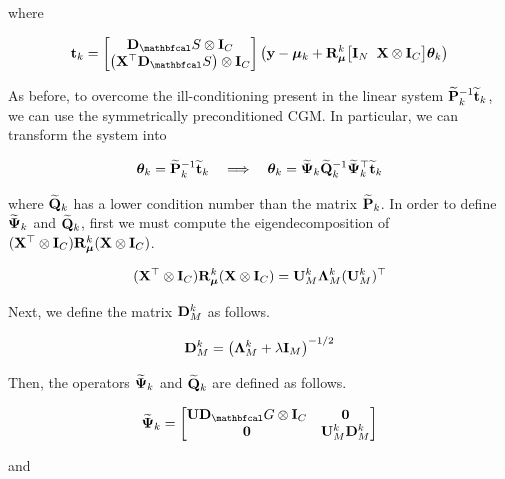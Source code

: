 \endgroup

where 

\begin{equation}
    \tee_k = \begin{bmatrix}
        \D_\St \otimes \I_C \\ \left(\X^\top \D_\St\right) \otimes \I_C
    \end{bmatrix} \left( \y - \muu_k + \RR_{\muu}^k  \big[\I_N \;\; \X \otimes \I_C\big] \thetaa_k \right)
\end{equation}

As before, to overcome the ill-conditioning present in the linear system $\widetilde{\mathbf{P}}_k^{-1} \widetilde{\mathbf{t}}_k $, we can use the symmetrically preconditioned CGM. In particular, we can transform the system into 

\begin{equation*}
    \boldsymbol{\theta}_k = \widetilde{\mathbf{P}}^{-1}_k \widetilde{\mathbf{t}}_k \quad \Longrightarrow \quad \boldsymbol{\theta}_k = \widetilde{\mathbf{\Psi}}_k \widetilde{\mathbf{Q}}_k^{-1} \widetilde{\mathbf{\Psi}}_k^\top \widetilde{\mathbf{t}}_k
\end{equation*}

where $\widetilde{\mathbf{Q}}_k$ has a lower condition number than the matrix $\widetilde{\mathbf{P}}_k$. In order to define $\widetilde{\mathbf{\Psi}}_k$ and $\widetilde{\mathbf{Q}}_k$, first we must compute the eigendecomposition of $(\mathbf{X}^\top \otimes \mathbf{I}_C) \mathbf{R}_{\boldsymbol{\mu}}^k (\mathbf{X} \otimes \mathbf{I}_C)$. 

\begin{equation}
    (\mathbf{X}^\top \otimes \mathbf{I}_C) \mathbf{R}_{\boldsymbol{\mu}}^k (\mathbf{X} \otimes \mathbf{I}_C) = \mathbf{U}_M^k \mathbf{\Lambda}_M^k (\mathbf{U}_M^k)^\top 
\end{equation}

Next, we define the matrix $\mathbf{D}_M^k$ as follows. 

\begin{equation}
    \mathbf{D}_M^k = \left(\mathbf{\Lambda}_M^k + \lambda \mathbf{I}_M\right)^{-1/2}
\end{equation}

Then, the operators $\widetilde{\mathbf{\Psi}}_k$ and $\widetilde{\mathbf{Q}}_k$ are defined as follows. 

\begin{equation}
    \widetilde{\PSI}_k = \begin{bmatrix}
        \U \D_\Gt \otimes \I_C & \zero \\
        \zero & \U_M^k \D_M^k
    \end{bmatrix}
\end{equation}

and 


